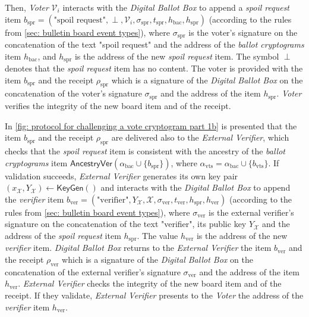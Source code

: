 Then, \textit{Voter} $\mathcal{V}_i$ interacts with the \textit{Digital Ballot Box} to append a \textit{spoil request} item $b_\mathrm{spr} = (\text{"spoil request"}, \perp, \mathcal{V}_i, \sigma_\mathrm{spr}, t_\mathrm{spr}, h_\mathrm{bac}, h_\mathrm{spr})$ (according to the rules from \cref{sec: bulletin board event types}), where $\sigma_\mathrm{spr}$ is the voter's signature on the concatenation of the text "spoil request" and the address of the \textit{ballot cryptograms} item $h_\mathrm{bac}$, and $h_\mathrm{spr}$ is the address of the new \textit{spoil request} item. The symbol $\perp$ denotes that the \textit{spoil request} item has no content. The voter is provided with the item $b_\mathrm{spr}$ and the receipt $\rho_\mathrm{spr}$ which is a signature of the \textit{Digital Ballot Box} on the concatenation of the voter's signature $\sigma_\mathrm{spr}$ and the address of the item $h_\mathrm{spr}$. \textit{Voter} verifies the integrity of the new board item and of the receipt.

In \cref{fig: protocol for challenging a vote cryptogram part 1b} is presented that the item $b_\mathrm{spr}$ and the receipt $\rho_\mathrm{spr}$ are delivered also to the \textit{External Verifier}, which checks that the \textit{spoil request} item is consistent with the ancestry of the \textit{ballot cryptograms} item $\mathsf{AncestryVer}(\alpha_\mathrm{bac} \cup \{ b_\mathrm{spr} \})$, where $\alpha_\mathrm{vts} = \alpha_\mathrm{bac} \cup \{ b_\mathrm{vts} \}$. If validation succeeds, \textit{External Verifier} generates its own key pair $(x_\mathcal{X}, Y_\mathcal{X}) \gets \mathsf{KeyGen}()$ and interacts with the \textit{Digital Ballot Box} to append the \textit{verifier} item $b_\mathrm{ver} = (\text{"verifier"}, Y_\mathcal{X}, \mathcal{X}, \sigma_\mathrm{ver}, t_\mathrm{ver}, h_\mathrm{spr}, h_\mathrm{ver})$ (according to the rules from \cref{sec: bulletin board event types}), where $\sigma_\mathrm{ver}$ is the external verifier's signature on the concatenation of the text "verifier", its public key $Y_\mathcal{X}$ and the address of the \textit{spoil request} item $h_\mathrm{spr}$. The value $h_\mathrm{ver}$ is the address of the new \textit{verifier} item. \textit{Digital Ballot Box} returns to the \textit{External Verifier} the item $b_\mathrm{ver}$ and the receipt $\rho_\mathrm{ver}$ which is a signature of the \textit{Digital Ballot Box} on the concatenation of the external verifier's signature $\sigma_\mathrm{ver}$ and the address of the item $h_\mathrm{ver}$. \textit{External Verifier} checks the integrity of the new board item and of the receipt. If they validate, \textit{External Verifier} presents to the \textit{Voter} the address of the \textit{verifier} item $h_\mathrm{ver}$.

